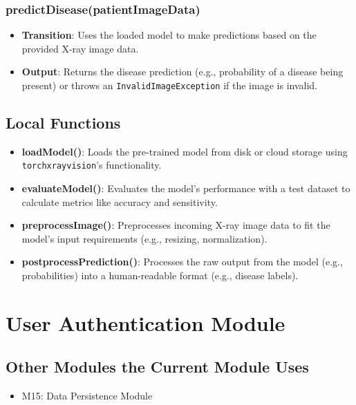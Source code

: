 \documentclass[12pt, titlepage]{article}
\begin{document}
\subsubsection{predictDisease(patientImageData)}
\begin{itemize}
    \item \textbf{Transition}: Uses the loaded model to make predictions based on the provided X-ray image data.
    \item \textbf{Output}: Returns the disease prediction (e.g., probability of a disease being present) or throws an \texttt{InvalidImageException} if the image is invalid.
\end{itemize}

\subsection{Local Functions}
\begin{itemize}
    \item \textbf{loadModel()}: Loads the pre-trained model from disk or cloud storage using \texttt{torchxrayvision}'s functionality.
    \item \textbf{evaluateModel()}: Evaluates the model’s performance with a test dataset to calculate metrics like accuracy and sensitivity.
    \item \textbf{preprocessImage()}: Preprocesses incoming X-ray image data to fit the model's input requirements (e.g., resizing, normalization).
    \item \textbf{postprocessPrediction()}: Processes the raw output from the model (e.g., probabilities) into a human-readable format (e.g., disease labels).
\end{itemize}

\section{User Authentication Module}

\subsection{Other Modules the Current Module Uses}
\begin{itemize}
    \item M15: Data Persistence Module
\end{itemize}
\end{document}
